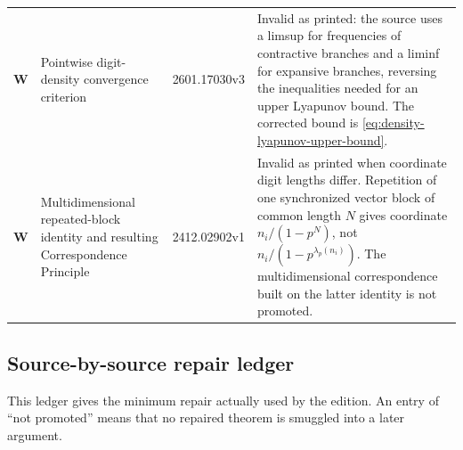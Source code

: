 \begin{longtable}{@{}p{}p{}p{}p{}@{}}
\textbf{W} & Pointwise digit-density convergence criterion &
2601.17030v3 & Invalid as printed: the source uses a limsup for frequencies
of contractive branches and a liminf for expansive branches, reversing the
inequalities needed for an upper Lyapunov bound.  The corrected bound is
\cref{eq:density-lyapunov-upper-bound}.\\

\textbf{W} & Multidimensional repeated-block identity and resulting
Correspondence Principle & 2412.02902v1 & Invalid as printed when coordinate
digit lengths differ.  Repetition of one synchronized vector block of common
length $N$ gives coordinate $n_i/(1-p^N)$, not
$n_i/(1-p^{\lambda_p(n_i)})$.  The multidimensional correspondence built on
the latter identity is not promoted.\\
\bottomrule
\end{longtable}
\endgroup

\subsection{Source-by-source repair ledger}

This ledger gives the minimum repair actually used by the edition.  An entry
of ``not promoted'' means that no repaired theorem is smuggled into a later
argument.

